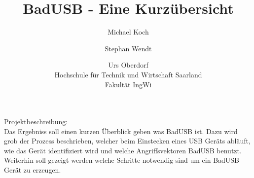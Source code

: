 \documentclass[ a4paper, 12pt, ]{article}
\title{BadUSB - Eine Kurzübersicht}
\author{Michael Koch \and{Stephan Wendt} \and{Urs Oberdorf}\\Hochschule für Technik und Wirtschaft Saarland\\Fakultät IngWi}
\date{} %
\begin{document}
\maketitle
Projektbeschreibung:\\
Das Ergebniss soll einen kurzen Überblick geben was BadUSB ist. Dazu wird grob der Prozess beschrieben,
welcher beim Einstecken eines USB Geräts abläuft, wie das Gerät identifiziert wird und welche 
Angriffsvektoren BadUSB benutzt. Weiterhin soll gezeigt werden welche Schritte notwendig sind um ein
BadUSB Gerät zu erzeugen.
\end{document}
